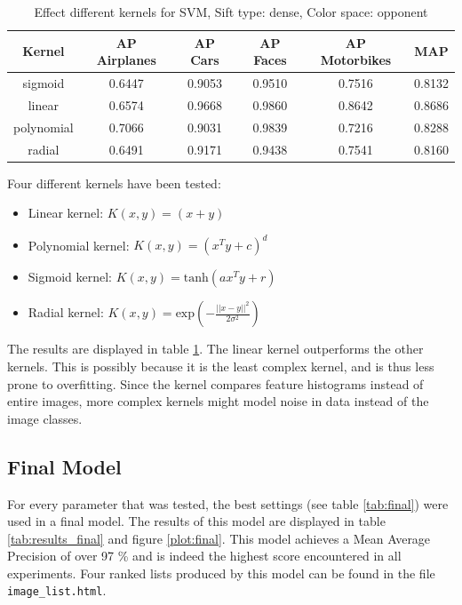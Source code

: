\begin{table}[H]
\begin{tabular}{|c|ccccc|}
\hline
\textbf{Kernel} & \textbf{AP Airplanes} & \textbf{AP Cars} & \textbf{AP Faces} & \textbf{AP Motorbikes} & \textbf{MAP}\\
\hline
sigmoid & 0.6447 & 0.9053 & 0.9510 & 0.7516 & 0.8132\\
linear & 0.6574 & 0.9668 & 0.9860 & 0.8642 & 0.8686 \\
polynomial & 0.7066 & 0.9031 & 0.9839& 0.7216& 0.8288\\
radial & 0.6491 & 0.9171 & 0.9438 & 0.7541 & 0.8160\\
\hline
\end{tabular}
\caption{Effect different kernels for SVM, Sift type: dense, Color space: opponent}
\label{tab:kernels}
\end{table}

Four different kernels have been tested:
\begin{itemize}
\item Linear kernel: $K(x,y) = (x+y)$\\
\item Polynomial kernel: $K(x,y) = (x^Ty + c)^d$\\
\item Sigmoid kernel: $K(x,y) = \text{tanh}(ax^Ty + r)$\\
\item Radial kernel: $K(x,y) = \text{exp}(-\frac{||x-y||^2}{2\sigma^2})$\\
\end{itemize}
The results are displayed in table \ref{tab:kernels}. The linear kernel outperforms the other kernels. This is possibly because it is the least complex kernel, and is thus less prone to overfitting. Since the kernel compares feature histograms instead of entire images, more complex kernels might model noise in data instead of the image classes.


\subsection{Final Model}
For every parameter that was tested, the best settings (see table \ref{tab:final}) were used in a final model. The results of this model are displayed in table \ref{tab:results_final} and figure \ref{plot:final}. This model achieves a Mean Average Precision of over 97 \% and is indeed the highest score encountered in all experiments. Four ranked lists produced by this model can be found in the file \verb|image_list.html|.
 
